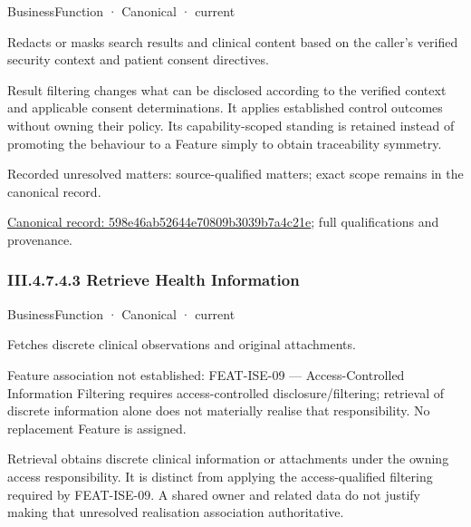 \label{element:598e46ab52644e70809b3039b7a4c21e}
{\small BusinessFunction · Canonical · current}\par

Redacts or masks search results and clinical content based on the caller's verified security context and patient consent directives.



Result filtering changes what can be disclosed according to the verified context and applicable consent determinations. It applies established control outcomes without owning their policy. Its capability-scoped standing is retained instead of promoting the behaviour to a Feature simply to obtain traceability symmetry.


{\small Recorded unresolved matters: source-qualified matters; exact scope remains in the canonical record.}\par
{\footnotesize \href{../../../../../../../../continuum/business/business-function/598e46ab52644e70809b3039b7a4c21e.md}{Canonical record: 598e46ab52644e70809b3039b7a4c21e}; full qualifications and provenance.}\par
\subsubsection*{III.4.7.4.3 Retrieve Health Information}
\label{navigation:III.4.7.4.3}

\label{element:0afb265973744f6f9e95ee54e6ea5b77}
{\small BusinessFunction · Canonical · current}\par

Fetches discrete clinical observations and original attachments.



Feature association not established: FEAT-ISE-09 — Access-Controlled Information Filtering requires access-controlled disclosure/filtering; retrieval of discrete information alone does not materially realise that responsibility. No replacement Feature is assigned.



Retrieval obtains discrete clinical information or attachments under the owning access responsibility. It is distinct from applying the access-qualified filtering required by FEAT-ISE-09. A shared owner and related data do not justify making that unresolved realisation association authoritative.


